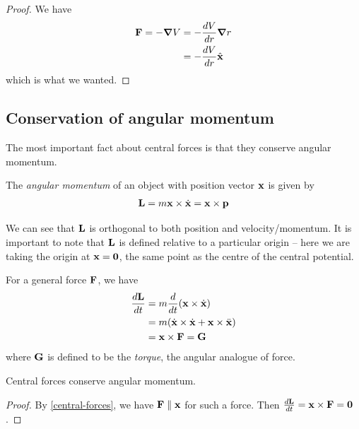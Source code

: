 \documentclass{../../template/note}
\begin{document}
    \begin{proof}
        We have
        \begin{align*}
            \V F = -\grad V &= -\frac{dV}{dr}\grad r \\
            &= -\frac{dV}{dr} \hvec x
        \end{align*}
        which is what we wanted.
    \end{proof}
    
    \subsection{Conservation of angular momentum}

    The most important fact about central forces is that they conserve angular momentum.

    \begin{definition}
        The \emph{angular momentum} of an object with position vector \(\V x\) is given by
        \begin{align*}
            \V L = m \V x \times \dot{\V x} = \V x \times \V p
        \end{align*}
    \end{definition}
    We can see that \(\V L\) is orthogonal to both position and velocity/momentum. It is important to note that \(\V L\) is defined relative to a particular origin -- here we are taking the origin at \(\V x = \V 0\), the same point as the centre of the central potential.

    For a general force \(\V F\), we have
    \begin{align*}
        \frac{d\V L}{dt} &= m \frac{d}{dt}(\V x \times \dot{\V x}) \\
        &= m(\dot{\V x} \times \dot{\V x} + \V x \times \ddot{\V x}) \\
        &= \V x \times \V F = \V G
    \end{align*}
    where \(\V G\) is defined to be the \emph{torque}, the angular analogue of force.
    
    \begin{proposition}
        Central forces conserve angular momentum.
    \end{proposition}
    
    \begin{proof}
        By \cref{central-forces}, we have \(\V F \parallel \V x\) for such a force. Then \(\frac{d\V L}{dt} = \V x \times \V F = \V 0\).
    \end{proof}
    
\end{document}
